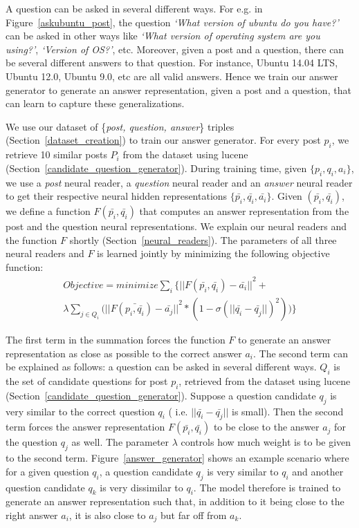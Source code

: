 \documentclass[11pt]{article}
\begin{document}
A question can be asked in several different ways. For e.g. in Figure~\ref{askubuntu_post}, the question \textit{`What version of ubuntu do you have?'} can be asked in other ways like \textit{`What version of operating system are you using?'}, \textit{`Version of OS?'}, etc.  
Moreover, given a post and a question, there can be several different answers to that question. For instance, Ubuntu 14.04 LTS, Ubuntu 12.0, Ubuntu 9.0, etc are all valid answers. Hence we train our answer generator to generate an answer representation, given a post and a question, that can learn to capture these generalizations. 

We use our dataset of \{\textit{post, question, answer}\} triples (Section~\ref{dataset_creation}) to train our answer generator. For every post $p_i$, we retrieve 10 similar posts $P_i$ from the dataset using lucene (Section~\ref{candidate_question_generator}). During training time, given $\{p_i, q_i, a_i\}$, we use a \textit{post} neural reader, a \textit{question} neural reader and an \textit{answer} neural reader to get their respective neural hidden representations $\{\bar{p_i}, \bar{q_i}, \bar{a_i}\}$.  Given $(\bar{p_i}, \bar{q_i})$, we define a function $F(\bar{p_i}, \bar{q_i})$ that computes an answer representation from the post and the question neural representations. We explain our neural readers and the function $F$ shortly (Section~\ref{neural_readers}). The parameters of all three neural readers and $F$ is learned jointly by minimizing the following objective function:\\

\begin{equation}
\begin{split}
Objective  = minimize \sum_i \Big \{ {|| F(\bar{p_i}, \bar{q_i}) - \bar{a_i}||}^2 + \\
 \lambda  \sum_{j \in Q_i} \Big ( {|| F(\bar{p_i, \bar{q_i}}) - \bar{a_j} ||}^2  *(1 - \sigma{(|| \bar{q_i} - \bar{q_j} ||)^2}) \Big ) \Big \}
\end{split}
\end{equation}

The first term in the summation forces the function $F$ to generate an answer representation as close as possible to the correct answer $a_i$. The second term can be explained as follows: a question can be asked in several different ways. $Q_i$ is the set of candidate questions for post $p_i$, retrieved from the dataset using lucene (Section~\ref{candidate_question_generator}).  Suppose a question candidate $q_j$ is very similar to the correct question $q_i$ ( i.e. $|| \bar{q_i} - \bar{q_j} ||$ is small). Then the second term forces the answer representation $F(\bar{p_i}, \bar{q_i})$ to be close to the answer $a_j$ for the question $q_j$ as well. The parameter $\lambda$ controls how much weight is to be given to the second term.  Figure~\ref{answer_generator} shows an example scenario where for a given question $q_i$, a question candidate $q_j$ is very similar to $q_i$ and another question candidate $q_k$ is very dissimilar to $q_i$. The model therefore is trained to generate an answer representation such that, in addition to it being close to the right answer $a_i$, it is also close to $a_j$ but far off from $a_k$. 
\end{document}
